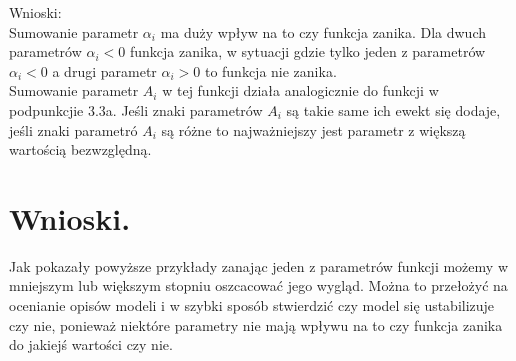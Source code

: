 \documentclass{article}
\begin{document}
\begin{flushleft}
Wnioski:\\
Sumowanie parametr $\alpha_i$ ma duży wpływ na to czy funkcja zanika. Dla dwuch parametrów $\alpha_i < 0 $ funkcja zanika, w sytuacji gdzie tylko jeden z parametrów $\alpha_i < 0$ a drugi parametr $\alpha_i > 0$ to funkcja nie zanika. \\
Sumowanie parametr $A_i$ w tej funkcji działa analogicznie do funkcji w podpunkcjie 3.3a. Jeśli znaki parametrów $A_i$ są takie same ich ewekt się 
dodaje, jeśli znaki parametró $A_i$ są różne to najważniejszy jest parametr z większą wartością bezwzględną.\\
\end{flushleft}



\section{Wnioski.}
Jak pokazały powyższe przykłady zanając jeden z parametrów funkcji możemy w mniejszym lub większym stopniu oszcacować jego wygląd. Można to przełożyć na ocenianie opisów modeli i w szybki sposób stwierdzić czy model się ustabilizuje czy nie, ponieważ niektóre parametry nie mają wpływu na to czy funkcja zanika do jakiejś wartości czy nie. 
\end{document}
